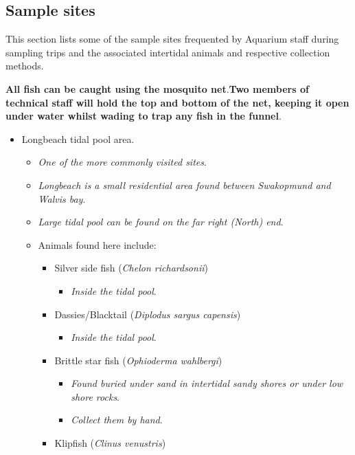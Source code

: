 \documentclass[
  12pt,
]{report}
\providecommand{\tightlist}{%
  \setlength{\itemsep}{0pt}\setlength{\parskip}{0pt}}\usepackage{longtable,booktabs,array}
\begin{document}
\hypertarget{sample-sites}{%
\subsection{Sample sites}\label{sample-sites}}

This section lists some of the sample sites frequented by Aquarium staff
during sampling trips and the associated intertidal animals and
respective collection methods.

\textbf{All fish can be caught using the mosquito net}.\textbf{Two
members of technical staff will hold the top and bottom of the net,
keeping it open under water whilst wading to trap any fish in the
funnel}.

\begin{itemize}
\tightlist
\item
  Longbeach tidal pool area.

  \begin{itemize}
  \tightlist
  \item
    \emph{One of the more commonly visited sites}.
  \item
    \emph{Longbeach is a small residential area found between Swakopmund
    and Walvis bay}.
  \item
    \emph{Large tidal pool can be found on the far right (North) end}.
  \item
    Animals found here include:

    \begin{itemize}
    \tightlist
    \item
      Silver side fish (\emph{Chelon richardsonii})

      \begin{itemize}
      \tightlist
      \item
        \emph{Inside the tidal pool}.
      \end{itemize}
    \item
      Dassies/Blacktail (\emph{Diplodus sargus capensis})

      \begin{itemize}
      \tightlist
      \item
        \emph{Inside the tidal pool}.
      \end{itemize}
    \item
      Brittle star fish (\emph{Ophioderma wahlbergi})

      \begin{itemize}
      \tightlist
      \item
        \emph{Found buried under sand in intertidal sandy shores or
        under low shore rocks}.
      \item
        \emph{Collect them by hand}.
      \end{itemize}
    \item
      Klipfish (\emph{Clinus venustris})


\end{itemize}
\end{itemize}
\end{itemize}
\end{document}
